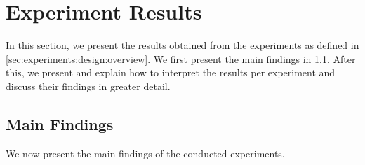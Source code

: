 \section{Experiment Results}
\label{sec:experiments:results}

In this section, we present the results obtained from the experiments as defined in \cref{sec:experiments:design:overview}. We first present the main findings in \cref{sec:experiments:main-findings}. After this, we present and explain how to interpret the results per experiment and discuss their findings in greater detail.


\subsection{Main Findings}
\label{sec:experiments:main-findings}

We now present the main findings of the conducted experiments.

    
    
